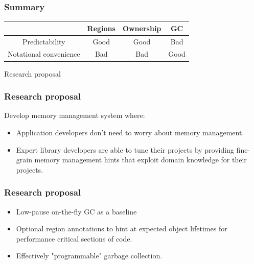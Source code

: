 \begin{frame}
    \frametitle{Summary}
    \Large
    \newcommand{\Best}{{\color{seagreen} Good}}
    \newcommand{\Worst}{{\color{alizarin} Bad}}
    \begin{center}
        \begin{tabular}{c | c | c | c}
                                   & Regions & Ownership & GC     \\
                                   \hline
            Predictability         & \Best   & \Best     & \Worst \\
            Notational convenience & \Worst  & \Worst    & \Best

        \end{tabular}
    \end{center}
\end{frame}

\begin{frame}
    \begin{center}
        {\LARGE Research proposal}
    \end{center}
\end{frame}

\begin{frame}
    \frametitle{Research proposal}
    Develop memory management system where:
    \begin{itemize}
        \item
            Application developers don't need to worry about memory
            management.
        \item
            Expert library developers are able to tune their projects
            by providing fine-grain memory management hints that
            exploit domain knowledge for their projects.
    \end{itemize}
\end{frame}


\begin{frame}
    \frametitle{Research proposal}
    \begin{itemize}
        \item
            Low-pause on-the-fly GC as a baseline
        \item
            Optional region annotations to hint at
            expected object lifetimes for performance
            critical sections of code.
        \item
            Effectively "programmable" garbage collection.
    \end{itemize}
\end{frame}
